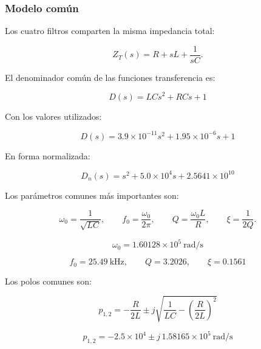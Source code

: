 \subsubsection{Modelo común}

Los cuatro filtros comparten la misma impedancia total:

\begin{equation}
    Z_T(s)=R+sL+\frac{1}{sC}.
\end{equation}

El denominador común de las funciones transferencia es:

\begin{equation}
    \boxed{
    D(s)=LCs^2+RCs+1
    }
\end{equation}

Con los valores utilizados:

\begin{equation}
    \boxed{
    D(s)=3.9\times10^{-11}s^2+1.95\times10^{-6}s+1
    }
\end{equation}

En forma normalizada:

\begin{equation}
    \boxed{
    D_n(s)=s^2+5.0\times10^4s+2.5641\times10^{10}
    }
\end{equation}

Los parámetros comunes más importantes son:

\begin{equation}
    \omega_0=\frac{1}{\sqrt{LC}},
    \qquad
    f_0=\frac{\omega_0}{2\pi},
    \qquad
    Q=\frac{\omega_0L}{R},
    \qquad
    \xi=\frac{1}{2Q}.
\end{equation}

\begin{equation}
    \boxed{
    \omega_0=1.60128\times10^5\ \mathrm{rad/s}
    }
\end{equation}

\begin{equation}
    \boxed{
    f_0=\SI{25.49}{\kilo\hertz},
    \qquad
    Q=3.2026,
    \qquad
    \xi=0.1561
    }
\end{equation}

Los polos comunes son:

\begin{equation}
    \boxed{
    p_{1,2}=
    -\frac{R}{2L}
    \pm j\sqrt{
    \frac{1}{LC}
    -
    \left(\frac{R}{2L}\right)^2
    }
    }
\end{equation}

\begin{equation}
    \boxed{
    p_{1,2}
    =
    -2.5\times10^4
    \pm j\,1.58165\times10^5
    \ \mathrm{rad/s}
    }
\end{equation}


